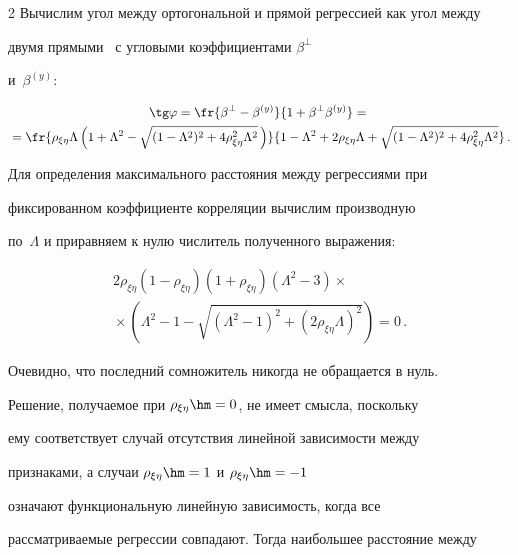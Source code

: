 \begin{multicols}{2}
Вычислим угол между ортогональной и прямой регрессией как угол между

двумя прямыми~\cite{12-tim} с угловыми коэффициентами $\beta^\perp$

и~$\beta^{(y)}$:

  \begin{multline*}

  \tg\varphi = \fr{\beta^\perp -\beta^{(y)}}{1+\beta^\perp \beta^{(y)}} ={}\\

  {}=

  \fr{\rho_{\xi\eta}\Lambda \left(1+\Lambda^2-\sqrt{(1-\Lambda^2)^2 +4

\rho^2_{\xi\eta}\Lambda^2}\,\right)} {1-\Lambda^2 +2\rho_{\xi\eta}\Lambda +

  \sqrt{(1-\Lambda^2)^2+4\rho^2_{\xi\eta}\Lambda^2}}\,.

  \end{multline*}



  Для определения максимального расстояния между регрессиями при

фиксированном коэффициенте корреляции вычислим производную

по~$\Lambda$ и приравняем к нулю числитель полученного выражения:

  \begin{multline*}

  2\rho_{\xi\eta}(1-\rho_{\xi\eta}) (1+\rho_{\xi\eta})(\Lambda^2-3)\times{}\\

  {}\times\left(

\Lambda^2 -1-\sqrt{\left(\Lambda^2-1\right)^2+\left(

2\rho_{\xi\eta}\Lambda\right)^2}\right) =0\,.

  \end{multline*}



  Очевидно, что последний сомножитель никогда не обращается в нуль.

Решение, получаемое при $\rho_{\xi\eta}\hm=0$, не имеет смысла, поскольку

ему соответствует случай отсутствия линейной зависимости между

признаками, а случаи $\rho_{\xi\eta}\hm=1$ и $\rho_{\xi\eta}\hm=-1$

означают функциональную линейную зависимость, когда все

рассматриваемые регрессии совпадают. Тогда наибольшее расстояние между


\end{multicols}
